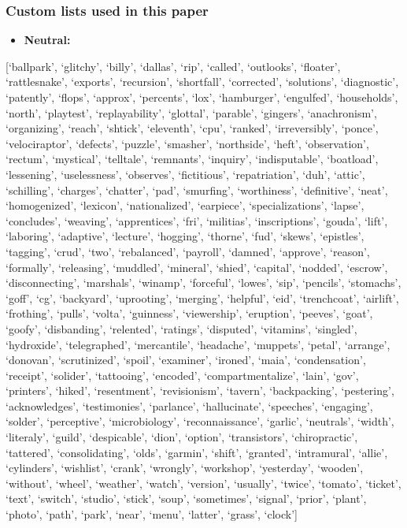 \documentclass[
  12pt,
  dvipsnames,enabledeprecatedfontcommands]{scrartcl}
\providecommand{\tightlist}{%
  \setlength{\itemsep}{0pt}\setlength{\parskip}{0pt}}
\begin{document}
\hypertarget{custom-lists-used-in-this-paper}{%
\subsubsection{\texorpdfstring{Custom lists used in this paper
\label{app:custom}}{Custom lists used in this paper }}\label{custom-lists-used-in-this-paper}}

\begin{itemize}
\tightlist
\item
  \textbf{Neutral:}
\end{itemize}

{[}`ballpark', `glitchy', `billy', `dallas', `rip', `called',
`outlooks', `floater', `rattlesnake', `exports', `recursion',
`shortfall', `corrected', `solutions', `diagnostic', `patently',
`flops', `approx', `percents', `lox', `hamburger', `engulfed',
`households', `north', `playtest', `replayability', `glottal',
`parable', `gingers', `anachronism', `organizing', `reach', `shtick',
`eleventh', `cpu', `ranked', `irreversibly', `ponce', `velociraptor',
`defects', `puzzle', `smasher', `northside', `heft', `observation',
`rectum', `mystical', `telltale', `remnants', `inquiry', `indisputable',
`boatload', `lessening', `uselessness', `observes', `fictitious',
`repatriation', `duh', `attic', `schilling', `charges', `chatter',
`pad', `smurfing', `worthiness', `definitive', `neat', `homogenized',
`lexicon', `nationalized', `earpiece', `specializations', `lapse',
`concludes', `weaving', `apprentices', `fri', `militias',
`inscriptions', `gouda', `lift', `laboring', `adaptive', `lecture',
`hogging', `thorne', `fud', `skews', `epistles', `tagging', `crud',
`two', `rebalanced', `payroll', `damned', `approve', `reason',
`formally', `releasing', `muddled', `mineral', `shied', `capital',
`nodded', `escrow', `disconnecting', `marshals', `winamp', `forceful',
`lowes', `sip', `pencils', `stomachs', `goff', `cg', `backyard',
`uprooting', `merging', `helpful', `eid', `trenchcoat', `airlift',
`frothing', `pulls', `volta', `guinness', `viewership', `eruption',
`peeves', `goat', `goofy', `disbanding', `relented', `ratings',
`disputed', `vitamins', `singled', `hydroxide', `telegraphed',
`mercantile', `headache', `muppets', `petal', `arrange', `donovan',
`scrutinized', `spoil', `examiner', `ironed', `maia', `condensation',
`receipt', `solider', `tattooing', `encoded', `compartmentalize',
`lain', `gov', `printers', `hiked', `resentment', `revisionism',
`tavern', `backpacking', `pestering', `acknowledges', `testimonies',
`parlance', `hallucinate', `speeches', `engaging', `solder',
`perceptive', `microbiology', `reconnaissance', `garlic', `neutrals',
`width', `literaly', `guild', `despicable', `dion', `option',
`transistors', `chiropractic', `tattered', `consolidating', `olds',
`garmin', `shift', `granted', `intramural', `allie', `cylinders',
`wishlist', `crank', `wrongly', `workshop', `yesterday', `wooden',
`without', `wheel', `weather', `watch', `version', `usually', `twice',
`tomato', `ticket', `text', `switch', `studio', `stick', `soup',
`sometimes', `signal', `prior', `plant', `photo', `path', `park',
`near', `menu', `latter', `grass', `clock'{]}
\end{document}
